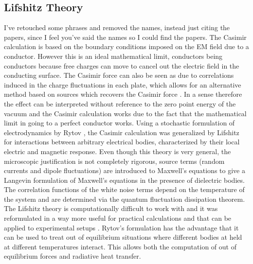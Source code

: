 \subsection{Lifshitz Theory}
{\color{red} I've retouched some phrases and removed the names, instead just citing the papers, since I feel you've said the names so I could find the papers. }
The Casimir calculation is based on the boundary conditions imposed on the EM field 
due to a conductor. However this is an ideal mathematical limit, conductors being conductors because free charges can move to cancel out the electric field in the conducting surface.
The Casimir force can also be seen as due to correlations induced in the charge fluctuations in each plate, which allows for an alternative method based on sources which recovers the Casimir force \cite{julian_schwinger_casimir_1978,schwinger_casimir_1992}. In a sense therefore the effect can be interpreted without reference to the zero point energy of the vacuum and the Casimir calculation works due to the fact that the mathematical limit in going to a perfect conductor works. 
Using a stochastic formulation of electrodynamics by Rytov \cite{sm_rytov_principles_1989}, the Casimir calculation was generalized by Lifshitz for interactions between arbitrary electrical bodies, characterized by their local electric and magnetic response\cite{lifshits_theory_1955}. 
Even though this theory is very general, the microscopic justification is not completely rigorous, source terms (random currents and dipole fluctuations) are introduced to Maxwell's equations to give a Langevin formulation of Maxwell's equations in the presence of dielectric bodies. The correlation functions of the white noise terms depend on the temperature of the system and are determined via the quantum fluctuation dissipation theorem. The Lifshitz theory is computationally difficult to work with and it was reformulated  in a way more useful for practical calculations and that can be applied to experimental setups \cite{van_kampen_macroscopic_1968,ninham_van_1970}.
Rytov's formulation has the advantage that it can be used to treat out of equilibrium situations where different bodies at held at different temperatures interact. This allows both the  computation of out of equilibrium forces and radiative  heat transfer. 

